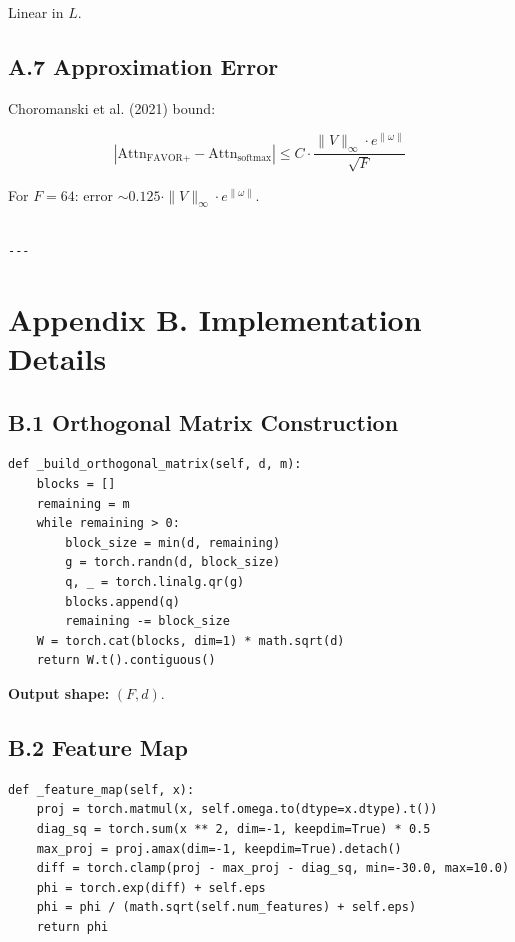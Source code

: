 Linear in $L$.

\subsection{A.7 Approximation Error}

Choromanski et al. (2021) bound:

\[
\left|\text{Attn}_{\text{FAVOR+}} - \text{Attn}_{\text{softmax}}\right| \leq C \cdot \frac{\|V\|_\infty \cdot e^{\|\omega\|}}{\sqrt{F}}
\tag{A.8}
\]

For $F = 64$: error $\sim 0.125 \cdot \|V\|_\infty \cdot e^{\|\omega\|}$.
\begin{lstlisting}

---
\end{lstlisting}


\section{Appendix B. Implementation Details}

\subsection{B.1 Orthogonal Matrix Construction}

\begin{lstlisting}
def _build_orthogonal_matrix(self, d, m):
    blocks = []
    remaining = m
    while remaining > 0:
        block_size = min(d, remaining)
        g = torch.randn(d, block_size)
        q, _ = torch.linalg.qr(g)
        blocks.append(q)
        remaining -= block_size
    W = torch.cat(blocks, dim=1) * math.sqrt(d)
    return W.t().contiguous()
\end{lstlisting}

\textbf{Output shape:} $(F, d)$.

\subsection{B.2 Feature Map}

\begin{lstlisting}
def _feature_map(self, x):
    proj = torch.matmul(x, self.omega.to(dtype=x.dtype).t())
    diag_sq = torch.sum(x ** 2, dim=-1, keepdim=True) * 0.5
    max_proj = proj.amax(dim=-1, keepdim=True).detach()
    diff = torch.clamp(proj - max_proj - diag_sq, min=-30.0, max=10.0)
    phi = torch.exp(diff) + self.eps
    phi = phi / (math.sqrt(self.num_features) + self.eps)
    return phi
\end{lstlisting}

